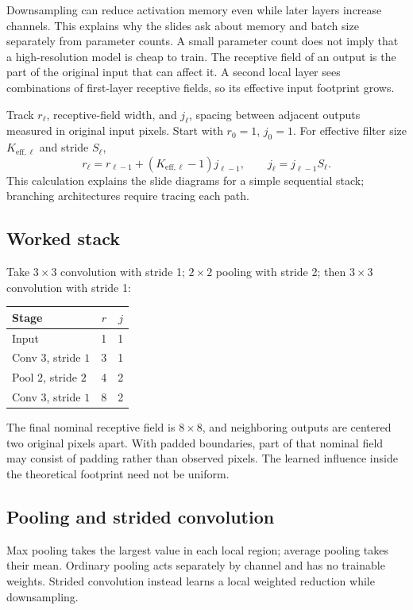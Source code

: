 \documentclass[11pt]{article}
\begin{document}
Downsampling can reduce activation memory even while later layers increase channels. This explains why the slides ask about memory and batch size separately from parameter counts. A small parameter count does not imply that a high-resolution model is cheap to train.
The receptive field of an output is the part of the original input that can affect it. A second local layer sees combinations of first-layer receptive fields, so its effective input footprint grows.

Track $r_\ell$, receptive-field width, and $j_\ell$, spacing between adjacent outputs measured in original input pixels. Start with $r_0=1$, $j_0=1$. For effective filter size $K_{\mathrm{eff},\ell}$ and stride $S_\ell$,
\[
r_\ell=r_{\ell-1}+(K_{\mathrm{eff},\ell}-1)j_{\ell-1},\qquad
j_\ell=j_{\ell-1}S_\ell.
\]
This calculation explains the slide diagrams for a simple sequential stack; branching architectures require tracing each path.
\subsection{Worked stack}
Take $3\times3$ convolution with stride 1; $2\times2$ pooling with stride 2; then $3\times3$ convolution with stride 1:
\begin{center}
\begin{tabular}{lrr}
\toprule Stage & $r$ & $j$\\\midrule
Input & 1 & 1\\
Conv $3$, stride $1$ & 3 & 1\\
Pool $2$, stride $2$ & 4 & 2\\
Conv $3$, stride $1$ & 8 & 2\\\bottomrule
\end{tabular}
\end{center}
The final nominal receptive field is $8\times8$, and neighboring outputs are centered two original pixels apart. With padded boundaries, part of that nominal field may consist of padding rather than observed pixels. The learned influence inside the theoretical footprint need not be uniform.
\subsection{Pooling and strided convolution}
Max pooling takes the largest value in each local region; average pooling takes their mean. Ordinary pooling acts separately by channel and has no trainable weights. Strided convolution instead learns a local weighted reduction while downsampling.
\end{document}
